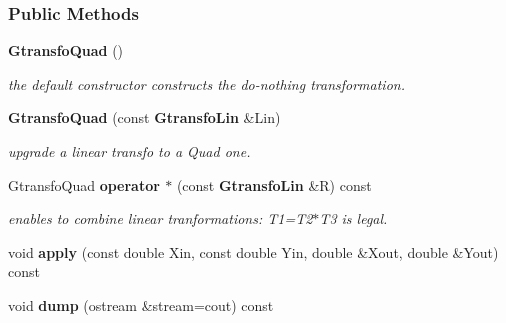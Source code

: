 \subsubsection*{Public Methods}
\begin{CompactItemize}
\item 
{}
{\bf Gtransfo\-Quad} ()\label{class_gtransfoquad_a0}

\begin{CompactList}\small\item\em the default constructor constructs the do-nothing transformation.\item\end{CompactList}\item 
{}
{\bf Gtransfo\-Quad} (const {\bf Gtransfo\-Lin} \&Lin)\label{class_gtransfoquad_a1}

\begin{CompactList}\small\item\em upgrade a linear transfo to a Quad one.\item\end{CompactList}\item 
{}
Gtransfo\-Quad {\bf operator $\ast$} (const {\bf Gtransfo\-Lin} \&R) const\label{class_gtransfoquad_a2}

\begin{CompactList}\small\item\em enables to combine linear tranformations: T1=T2$\ast$T3 is legal.\item\end{CompactList}\item 
{}
void {\bf apply} (const double Xin, const double Yin, double \&Xout, double \&Yout) const\label{class_gtransfoquad_a3}

\item 
{}
void {\bf dump} (ostream \&stream=cout) const\label{class_gtransfoquad_a4}


\end{CompactItemize}
